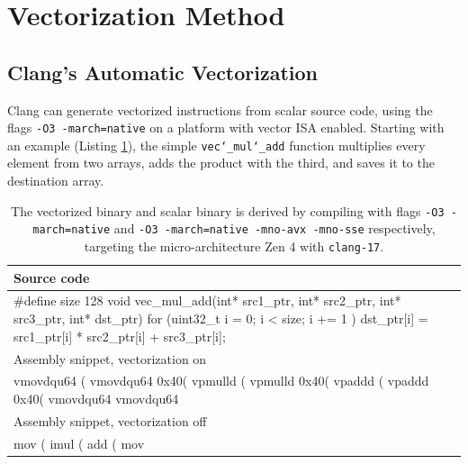 \documentclass[logo,bsc,singlespacing,parskip]{infthesis}
\newenvironment{VerbatimCompact}
  {\vspace*{-2.5mm}\VerbatimEnvironment
   \par\Verbatim}
  {\endVerbatim\vspace*{-2.4mm}}
\begin{document}
\section{Vectorization Method}
\label{sec:vectorization-method}
\subsection{Clang's Automatic Vectorization}
Clang can generate vectorized instructions from scalar source code, using the flags \texttt{-O3 -march=native} on a platform with vector ISA enabled. Starting with an example (Listing \ref{vec-add-float-auto}), the simple \texttt{vec\char`_mul\char`_add} function multiplies every element from two arrays, adds the product with the third, and saves it to the destination array. 

\begin{table}[ht]\captionsetup{name=Listing}
\begin{tabular}{>{\raggedright\arraybackslash}p{13cm}}
    Source code\\
    \midrule
    \begin{VerbatimCompact}
#define size 128
void vec_mul_add(int* src1_ptr, int* src2_ptr, 
                 int* src3_ptr, int* dst_ptr) {
    for (uint32_t i = 0; i < size; i += 1 ){
        dst_ptr[i] = src1_ptr[i] * src2_ptr[i] + src3_ptr[i];
    }
}
    \end{VerbatimCompact}
    \\

    Assembly snippet, vectorization on\\
    \midrule
    \begin{VerbatimCompact}
vmovdqu64   (%
vmovdqu64   0x40(%
vpmulld     (%
vpmulld     0x40(%
vpaddd      (%
vpaddd      0x40(%
vmovdqu64   %
vmovdqu64   %
    \end{VerbatimCompact}
    \\
    Assembly snippet, vectorization off\\
    \midrule
    \begin{VerbatimCompact}
mov    (%
imul   (%
add    (%
mov    %
    \end{VerbatimCompact}
\end{tabular}
\caption{The vectorized binary and scalar binary is derived by compiling with flags
\texttt{-O3 -march=native} and \texttt{-O3 -march=native -mno-avx -mno-sse}
respectively, targeting the micro-architecture Zen 4 with \texttt{clang-17}.}
\label{vec-add-float-auto}
\end{table}
\end{document}
